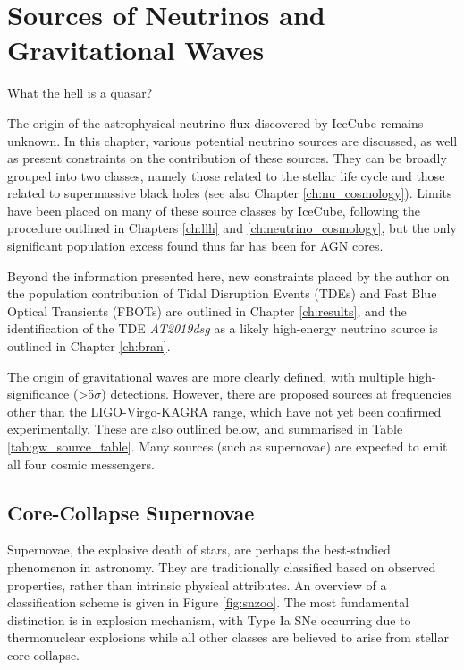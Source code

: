\setchapterpreamble[u]{\margintoc}
\chapter{Sources of Neutrinos and Gravitational Waves}

\begin{fquote} What the hell is a quasar?
\end{fquote}


The origin of the astrophysical neutrino flux discovered by IceCube remains unknown. In this chapter, various potential neutrino sources are discussed, as well as present constraints on the contribution of these sources. They can be broadly grouped into two classes, namely those related to the stellar life cycle and those related to supermassive black holes (see also Chapter \ref{ch:nu_cosmology}). Limits have been placed on many of these source classes by IceCube, following the procedure outlined in Chapters \ref{ch:llh} and \ref{ch:neutrino_cosmology}, but the only significant population excess found thus far has been for AGN cores.

Beyond the information presented here, new constraints placed by the author on the population contribution of Tidal Disruption Events (TDEs) and Fast Blue Optical Transients (FBOTs) are outlined in Chapter \ref{ch:results}, and the identification of the TDE \emph{AT2019dsg} as a likely high-energy neutrino source is outlined in Chapter \ref{ch:bran}.  

The origin of gravitational waves are more clearly defined, with multiple high-significance (>5$\sigma$) detections. However, there are proposed sources at frequencies other than the LIGO-Virgo-KAGRA range, which have not yet been confirmed experimentally. These are also outlined below, and summarised in Table \ref{tab:gw_source_table}. Many sources (such as supernovae) are expected to emit all four cosmic messengers.

\section{Core-Collapse Supernovae}
\label{sec:ccsn}

Supernovae, the explosive death of stars, are perhaps the best-studied phenomenon in astronomy. They are traditionally classified based on observed properties, rather than intrinsic physical attributes. An overview of a classification scheme is given in Figure \ref{fig:snzoo}. The most fundamental distinction is in explosion mechanism, with Type Ia SNe occurring due to thermonuclear explosions while all other classes are believed to arise from stellar core collapse. 

